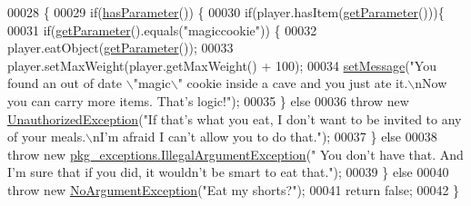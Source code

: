\begin{DoxyCode}
00028                                                                                                            
                              \{
00029         \textcolor{keywordflow}{if}(\hyperlink{classpkg__commands_1_1Command_a02af95ab3f1898a66259ab7c177b6998}{hasParameter}()) \{
00030             \textcolor{keywordflow}{if}(player.hasItem(\hyperlink{classpkg__commands_1_1Command_a41c92d445be73ea9d62320c65efb8434}{getParameter}()))\{
00031                 \textcolor{keywordflow}{if}(\hyperlink{classpkg__commands_1_1Command_a41c92d445be73ea9d62320c65efb8434}{getParameter}().equals(\textcolor{stringliteral}{"magiccookie"})) \{
00032                     player.eatObject(\hyperlink{classpkg__commands_1_1Command_a41c92d445be73ea9d62320c65efb8434}{getParameter}());
00033                     player.setMaxWeight(player.getMaxWeight() + 100);
00034                     \hyperlink{classpkg__commands_1_1Command_ae210ff216fe908b111ba1c988a963d13}{setMessage}(\textcolor{stringliteral}{"You found an out of date \(\backslash\)"magic\(\backslash\)" cookie inside a cave and you
       just ate it.\(\backslash\)nNow you can carry more items. That's logic!"});
00035                 \} \textcolor{keywordflow}{else}
00036                     \textcolor{keywordflow}{throw} \textcolor{keyword}{new} \hyperlink{classpkg__exceptions_1_1UnauthorizedException}{UnauthorizedException}(\textcolor{stringliteral}{"If that's what you eat, I don't
       want to be invited to any of your meals.\(\backslash\)nI'm afraid I can't allow you to do that."});
00037             \} \textcolor{keywordflow}{else} 
00038                 \textcolor{keywordflow}{throw} \textcolor{keyword}{new} \hyperlink{classpkg__exceptions_1_1IllegalArgumentException}{pkg\_exceptions.IllegalArgumentException}(\textcolor{stringliteral}{"
      You don't have that. And I'm sure that if you did, it wouldn't be smart to eat that."});
00039         \} \textcolor{keywordflow}{else} 
00040             \textcolor{keywordflow}{throw} \textcolor{keyword}{new} \hyperlink{classpkg__exceptions_1_1NoArgumentException}{NoArgumentException}(\textcolor{stringliteral}{"Eat my shorts?"});
00041         \textcolor{keywordflow}{return} \textcolor{keyword}{false};
00042     \}
\end{DoxyCode}


